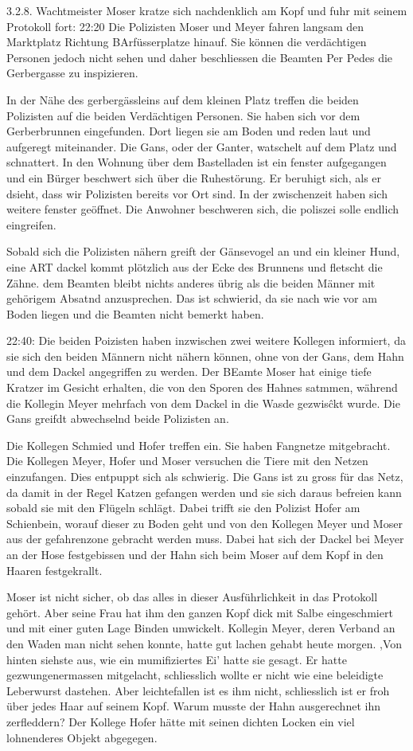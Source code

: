 3.2.8.
Wachtmeister Moser kratze sich nachdenklich am Kopf und fuhr mit seinem Protokoll fort: 22:20 Die Polizisten Moser und Meyer fahren langsam den Marktplatz Richtung BArfüsserplatze hinauf. Sie können die verdächtigen Personen jedoch  nicht sehen und daher beschliessen die Beamten Per Pedes die Gerbergasse zu inspizieren.

In der Nähe des gerbergässleins auf dem kleinen Platz treffen die beiden Polizisten auf die beiden Verdächtigen Personen. Sie haben sich vor dem Gerberbrunnen eingefunden. Dort liegen sie am Boden und reden laut und aufgeregt miteinander. Die Gans, oder der Ganter, watschelt auf dem Platz und schnattert. In den Wohnung über dem Bastelladen ist ein fenster aufgegangen und ein Bürger beschwert sich über die Ruhestörung. Er beruhigt sich, als er dsieht, dass wir Polizisten bereits vor Ort sind. In der zwischenzeit haben sich weitere fenster geöffnet. Die Anwohner beschweren sich, die poliszei solle endlich eingreifen.

Sobald sich die Polizisten nähern greift der Gänsevogel an und ein kleiner Hund, eine ART dackel kommt plötzlich aus der Ecke des Brunnens und fletscht die Zähne. dem Beamten bleibt nichts anderes übrig als die beiden Männer mit gehörigem Absatnd anzusprechen. Das ist schwierid, da sie nach wie vor am Boden liegen und die Beamten nicht bemerkt haben.

22:40: Die beiden Poizisten haben inzwischen zwei weitere Kollegen informiert, da sie sich den beiden Männern nicht nähern können, ohne von der Gans, dem Hahn und dem Dackel angegriffen zu werden. Der BEamte Moser hat einige tiefe Kratzer im Gesicht erhalten, die von den Sporen des Hahnes satmmen, während die Kollegin Meyer mehrfach von dem Dackel in die Wasde gezwisĉkt wurde. Die Gans greifdt abwechselnd beide Polizisten an.

Die Kollegen Schmied und Hofer treffen ein. Sie haben Fangnetze mitgebracht. Die Kollegen Meyer, Hofer und Moser versuchen die Tiere mit den Netzen einzufangen. Dies entpuppt sich als schwierig. Die Gans ist zu gross für das Netz, da damit in der Regel Katzen gefangen werden und sie sich daraus befreien kann sobald sie mit den Flügeln schlägt. Dabei trifft sie den Polizist Hofer am Schienbein, worauf dieser zu Boden geht und von den Kollegen Meyer und Moser aus der gefahrenzone gebracht werden muss. Dabei hat sich der Dackel bei Meyer an der Hose festgebissen und der Hahn sich beim  Moser auf dem Kopf in den Haaren festgekrallt.

Moser ist nicht sicher, ob das alles in dieser Ausführlichkeit in das Protokoll gehört. Aber seine Frau hat ihm den ganzen Kopf dick mit Salbe eingeschmiert  und mit einer guten Lage Binden umwickelt. Kollegin Meyer, deren Verband an den Waden man nicht sehen konnte, hatte gut lachen gehabt heute morgen. ,Von hinten siehste aus, wie ein mumifiziertes Ei' hatte sie gesagt. Er hatte gezwungenermassen mitgelacht, schliesslich wollte er nicht wie eine beleidigte Leberwurst dastehen. Aber leichtefallen ist es ihm nicht, schliesslich ist er froh über jedes Haar auf seinem Kopf. Warum musste der Hahn ausgerechnet ihn zerfleddern? Der Kollege Hofer hätte mit seinen dichten Locken ein viel lohnenderes Objekt abgegegen.

